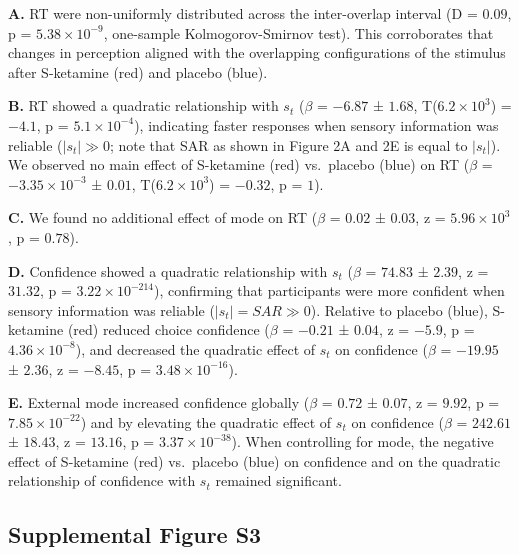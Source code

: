 \documentclass[
]{article}
\begin{document}
\textbf{A.} RT were non-uniformly distributed across the inter-overlap
interval (D = \(0.09\), p = \(\ensuremath{5.38\times 10^{-9}}\),
one-sample Kolmogorov-Smirnov test). This corroborates that changes in
perception aligned with the overlapping configurations of the stimulus
after S-ketamine (red) and placebo (blue).

\textbf{B.} RT showed a quadratic relationship with \(s_t\) (\(\beta\) =
\(-6.87\) ± \(1.68\), T(\(\ensuremath{6.2\times 10^{3}}\)) = \(-4.1\), p
= \(\ensuremath{5.1\times 10^{-4}}\)), indicating faster responses when
sensory information was reliable (\(|s_t| \gg  0\); note that SAR as
shown in Figure 2A and 2E is equal to \(|s_t|\)). We observed no main
effect of S-ketamine (red) vs.~placebo (blue) on RT (\(\beta\) =
\(\ensuremath{-3.35\times 10^{-3}}\) ± \(0.01\),
T(\(\ensuremath{6.2\times 10^{3}}\)) = \(-0.32\), p = \(1\)).

\textbf{C.} We found no additional effect of mode on RT (\(\beta\) =
\(0.02\) ± \(0.03\), z = \(\ensuremath{5.96\times 10^{3}}\), p =
\(0.78\)).

\textbf{D.} Confidence showed a quadratic relationship with \(s_t\)
(\(\beta\) = \(74.83\) ± \(2.39\), z = \(31.32\), p =
\(\ensuremath{3.22\times 10^{-214}}\)), confirming that participants
were more confident when sensory information was reliable
(\(|s_t| = SAR \gg  0\)). Relative to placebo (blue), S-ketamine (red)
reduced choice confidence (\(\beta\) = \(-0.21\) ± \(0.04\), z =
\(-5.9\), p = \(\ensuremath{4.36\times 10^{-8}}\)), and decreased the
quadratic effect of \(s_t\) on confidence (\(\beta\) = \(-19.95\) ±
\(2.36\), z = \(-8.45\), p = \(\ensuremath{3.48\times 10^{-16}}\)).

\textbf{E.} External mode increased confidence globally (\(\beta\) =
\(0.72\) ± \(0.07\), z = \(9.92\), p =
\(\ensuremath{7.85\times 10^{-22}}\)) and by elevating the quadratic
effect of \(s_t\) on confidence (\(\beta\) = \(242.61\) ± \(18.43\), z =
\(13.16\), p = \(\ensuremath{3.37\times 10^{-38}}\)). When controlling
for mode, the negative effect of S-ketamine (red) vs.~placebo (blue) on
confidence and on the quadratic relationship of confidence with \(s_t\)
remained significant.

\newpage

\subsection{Supplemental Figure S3}\label{supplemental-figure-s3}
\end{document}
